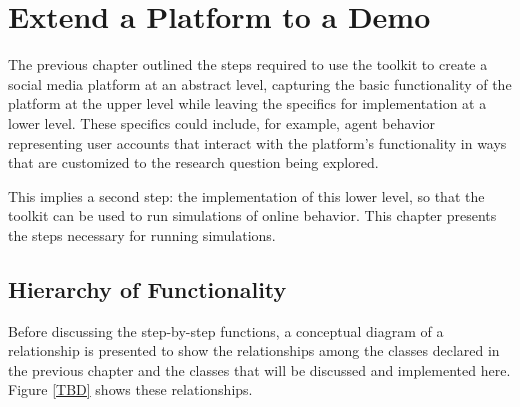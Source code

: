 
\chapter{Extend a Platform to a Demo}\label{chap:ExtendAPlatformToADemo}
The previous chapter outlined the steps required to use the \rhpc  toolkit to create a social media platform at an abstract level, capturing the basic functionality of the platform at the upper level while leaving the specifics for implementation at a lower level. These specifics could include, for example, agent behavior representing user accounts that interact with the platform's functionality in ways that are customized to the research question being explored.

This implies a second step: %
the implementation of this lower level, so that the toolkit can be used to run simulations of online behavior. This chapter presents the steps necessary for running simulations.

\section{Hierarchy of Functionality}
Before discussing the step-by-step functions, a conceptual diagram of a relationship is presented to show the relationships among the classes declared in the previous chapter and the classes that will be discussed and implemented here. 
Figure \ref{TBD} shows these relationships.%

